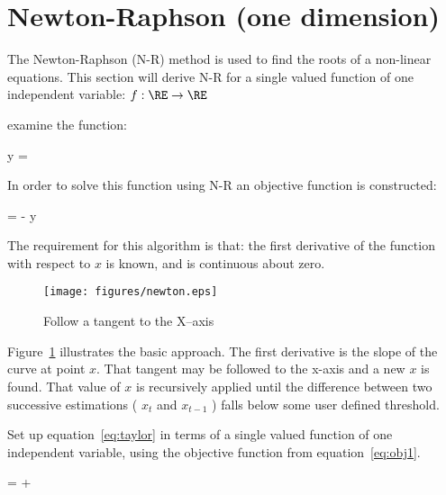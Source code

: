 \documentclass{article}
\begin{document}
\section{Newton-Raphson (one dimension)\label{sec:newton}}

The Newton-Raphson (N-R) method is used to find the roots of a non-linear equations.
This section will derive N-R for a single valued function of one independent variable:
$f:\RE\rightarrow\RE$

examine the function:

\begin{tcequation}
  y = 
\end{tcequation}

In order to solve this function using N-R an objective function is constructed:

\begin{tcequation}
   =  - y
  \label{eq:obj1}
\end{tcequation}

The requirement for this algorithm is that: the first derivative of the 
function with respect to $x$ is known, and is continuous about zero.

\begin{figure}[h]
  \begin{center}
    \texttt{[image: figures/newton.eps]}
    \caption{Follow a tangent to the X--axis\label{fig:newton}}
  \end{center}
\end{figure}

Figure~\ref{fig:newton} illustrates the basic approach. The first derivative is the 
slope of the curve at point $x$. That tangent may be followed to the x-axis and a new
$x$ is found. That value of $x$ is recursively applied until the difference between 
two successive estimations ( $x_t$ and $x_{t-1}$ ) falls below some user defined threshold.

Set up equation~\ref{eq:taylor} in terms of a single valued function of one independent
variable, using the objective function from equation~\ref{eq:obj1}.

\begin{tcequation}
   =  + \epsilon
\end{tcequation}
\end{document}
